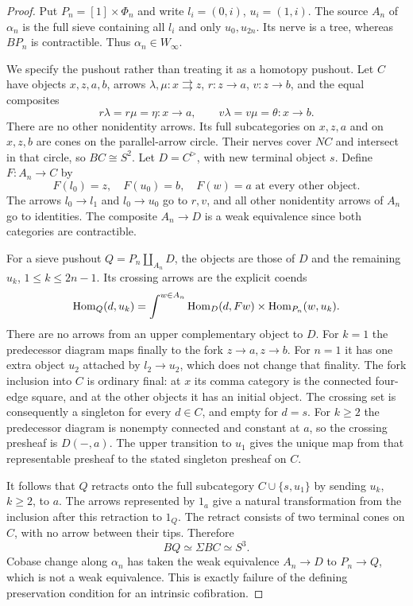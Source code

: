 \begin{proof}
Put $P_n=[1]\times\Phi_n$ and write $l_i=(0,i)$, $u_i=(1,i)$. The source $A_n$ of $\alpha_n$ is the full sieve containing all $l_i$ and only $u_0,u_{2n}$. Its nerve is a tree, whereas $BP_n$ is contractible. Thus $\alpha_n\in W_\infty$.

We specify the pushout rather than treating it as a homotopy pushout. Let $C$ have objects $x,z,a,b$, arrows $\lambda,\mu:x\rightrightarrows z$, $r:z\to a$, $v:z\to b$, and the equal composites
\[
 r\lambda=r\mu=\eta:x\to a,\qquad
 v\lambda=v\mu=\theta:x\to b.
\]
There are no other nonidentity arrows. Its full subcategories on $x,z,a$ and on $x,z,b$ are cones on the parallel-arrow circle. Their nerves cover $NC$ and intersect in that circle, so $BC\cong S^2$. Let $D=C^{\triangleright}$, with new terminal object $s$. Define $F:A_n\to C$ by
\[
 F(l_0)=z,\quad F(u_0)=b,\quad F(w)=a\text{ at every other object}.
\]
The arrows $l_0\to l_1$ and $l_0\to u_0$ go to $r,v$, and all other nonidentity arrows of $A_n$ go to identities. The composite $A_n\to D$ is a weak equivalence since both categories are contractible.

For a sieve pushout $Q=P_n\amalg_{A_n}D$, the objects are those of $D$ and the remaining $u_k$, $1\leq k\leq2n-1$. Its crossing arrows are the explicit coends
\[
 \operatorname{Hom}_Q(d,u_k)=\int^{w\in A_n}
       \operatorname{Hom}_D(d,Fw)\times\operatorname{Hom}_{P_n}(w,u_k).
\]
There are no arrows from an upper complementary object to $D$. For $k=1$ the predecessor diagram maps finally to the fork $z\to a,z\to b$. For $n=1$ it has one extra object $u_2$ attached by $l_2\to u_2$, which does not change that finality. The fork inclusion into $C$ is ordinary final: at $x$ its comma category is the connected four-edge square, and at the other objects it has an initial object. The crossing set is consequently a singleton for every $d\in C$, and empty for $d=s$. For $k\geq2$ the predecessor diagram is nonempty connected and constant at $a$, so the crossing presheaf is $D(-,a)$. The upper transition to $u_1$ gives the unique map from that representable presheaf to the stated singleton presheaf on $C$.

It follows that $Q$ retracts onto the full subcategory $C\cup\{s,u_1\}$ by sending $u_k$, $k\geq2$, to $a$. The arrows represented by $1_a$ give a natural transformation from the inclusion after this retraction to $1_Q$. The retract consists of two terminal cones on $C$, with no arrow between their tips. Therefore
\[
 BQ\simeq\Sigma BC\simeq S^3.
\]
Cobase change along $\alpha_n$ has taken the weak equivalence $A_n\to D$ to $P_n\to Q$, which is not a weak equivalence. This is exactly failure of the defining preservation condition for an intrinsic cofibration.


\end{proof}
